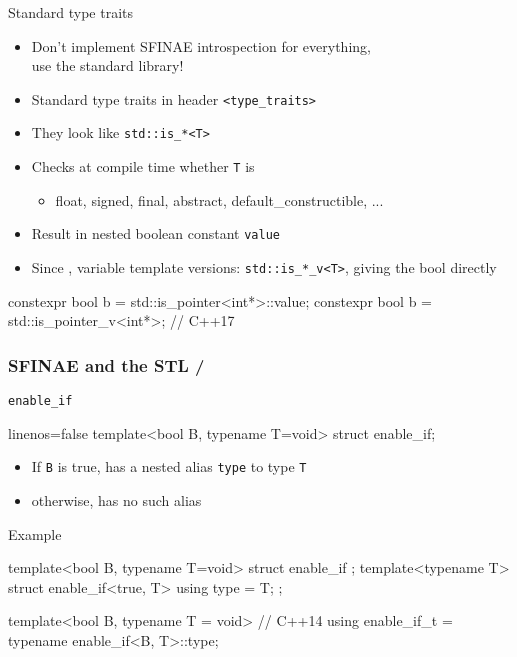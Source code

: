 \begin{frame}[fragile]
  \begin{block}{Standard type traits}
    \begin{itemize}
    \item Don't implement SFINAE introspection for everything,\\
          use the standard library!
    \item Standard type traits in header \texttt{<type_traits>}
    \item They look like \texttt{std::is_*<T>}
    \item Checks at compile time whether \texttt{T} is
    \begin{itemize}
      \item float, signed, final, abstract, default\_constructible, ...
    \end{itemize}
    \item Result in nested boolean constant \texttt{value}
    \item Since , variable template versions: \texttt{std::is_*_v<T>}, giving the bool directly
    \end{itemize}
  \end{block}
  \begin{cppcode*}{}
    constexpr bool b = std::is_pointer<int*>::value;
    constexpr bool b = std::is_pointer_v<int*>; // C++17
  \end{cppcode*}
\end{frame}

\begin{frame}[fragile]
  \frametitle{SFINAE and the STL \hfill {}/}
  \begin{block}{\texttt{enable\_if}}
    \begin{cppcode*}{linenos=false}
      template<bool B, typename T=void>
      struct enable_if;
    \end{cppcode*}
    \begin{itemize}
    \item If \texttt{B} is true, has a nested alias \texttt{type} to type \texttt{T}
    \item otherwise, has no such alias
    \end{itemize}
  \end{block}
  \begin{exampleblock}{Example}
    \begin{cppcode*}{}
      template<bool B, typename T=void>
      struct enable_if {};
      template<typename T>
      struct enable_if<true, T> { using type = T; };

      template<bool B, typename T = void> // C++14
      using enable_if_t = typename enable_if<B, T>::type;
    \end{cppcode*}
  \end{exampleblock}
\end{frame}

